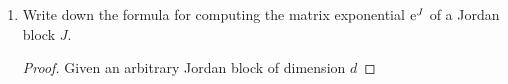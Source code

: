 \documentclass[../psets.tex]{subfiles}
\begin{document}
\begin{enumerate}
\begin{proof}
        In three dimensions, consider the matrix
        \begin{equation*}
            \begin{pmatrix}
                3 & 1 & -1\\
                1 & 3 & -2\\
                0 & 0 & 1\\
            \end{pmatrix}
        \end{equation*}
        which sends $(1,1,0)$ to $(4,4,0)$, $(1,-1,0)$ to $(2,-2,0)$, and $(0,1,1)$ to itself. With respect to the basis
        \begin{equation*}
            B = \left\{
                \begin{pmatrix}
                    1\\
                    1\\
                    0\\
                \end{pmatrix},
                \begin{pmatrix}
                    1\\
                    -1\\
                    0\\
                \end{pmatrix},
                \begin{pmatrix}
                    0\\
                    1\\
                    1\\
                \end{pmatrix}
            \right\}
        \end{equation*}
        the matrix of this linear transformation is
        \begin{equation*}
            \begin{pmatrix}
                4 & 0 & 0\\
                0 & 2 & 0\\
                0 & 0 & 1\\
            \end{pmatrix}
        \end{equation*}
    \end{proof}
    \item Write down the formula for computing the matrix exponential $\e[J]$ of a Jordan block $J$.
    \begin{proof}
        Given an arbitrary Jordan block of dimension $d$

\end{proof}
\end{enumerate}
\end{document}
